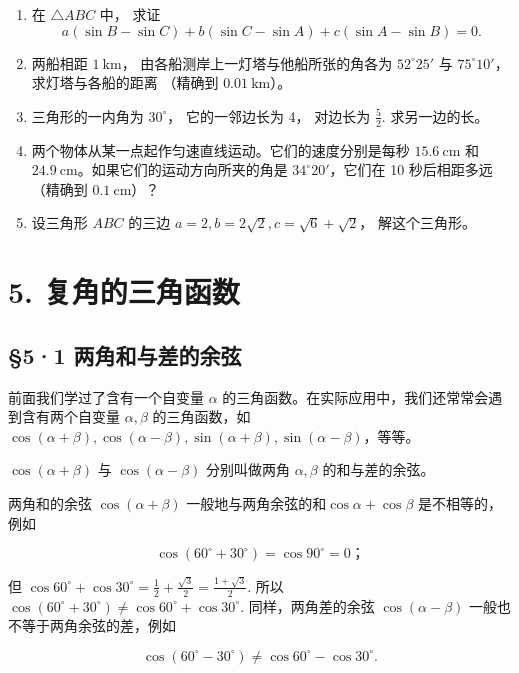 \begin{enumerate}
\item
  在 \(\triangle ABC\) 中， 求证
\[
a (\sin B - \sin C) + b (\sin C - \sin A) + c (\sin A - \sin B) = 0.
\]
\item
  两船相距 \(1 \mathrm{~km}\)， 由各船测岸上一灯塔与他船所张的角各为
  \(52^{\circ} 25'\) 与 \(75^{\circ} 10'\)， 求灯塔与各船的距离 （精确到
  \(0.01 \mathrm{~km}\)）。
\item
  三角形的一内角为 \(30^{\circ}\)， 它的一邻边长为 4， 对边长为
  \(\frac{5}{2}\). 求另一边的长。
\item
  两个物体从某一点起作匀速直线运动。它们的速度分别是每秒
  \(15.6 \mathrm{~cm}\) 和
  \(24.9 \mathrm{~cm}\)。如果它们的运动方向所夹的角是
  \(34^{\circ}20'\)，它们在 10 秒后相距多远（精确到
  \(0.1 \mathrm{~cm}\)）？
\item
  设三角形 \(ABC\) 的三边
  \(a = 2, b = 2\sqrt{2}, c = \sqrt{6} + \sqrt{2}\)， 解这个三角形。
\end{enumerate}

\chapter{5. 复角的三角函数}

\section{§5·1 两角和与差的余弦}

前面我们学过了含有一个自变量 \(\alpha\)
的三角函数。在实际应用中，我们还常常会遇到含有两个自变量
\(\alpha, \beta\) 的三角函数，如
\(\cos (\alpha + \beta), \cos (\alpha - \beta), \sin (\alpha + \beta), \sin (\alpha - \beta)\)，等等。

\(\cos (\alpha +\beta)\) 与 \(\cos (\alpha -\beta)\) 分别叫做两角
\(\alpha ,\beta\) 的和与差的余弦。

两角和的余弦 \(\cos (\alpha +\beta)\)
一般地与两角余弦的和\(\cos \alpha +\cos \beta\) 是不相等的，例如

\[
\cos (60 ^{\circ} + 30 ^{\circ}) = \cos 90 ^{\circ} = 0\text{；}
\]

但
\(\cos 60^{\circ} + \cos 30^{\circ} = \frac{1}{2} +\frac{\sqrt{3}}{2} = \frac{1 + \sqrt{3}}{2}.\)
所以
\(\cos (60^{\circ} + 30^{\circ})\neq \cos 60^{\circ} + \cos 30^{\circ}.\)
同样，两角差的余弦 \(\cos (\alpha -\beta)\)
一般也不等于两角余弦的差，例如

\[
\cos (60 ^{\circ} - 30 ^{\circ}) \neq \cos 60 ^{\circ} - \cos 30 ^{\circ}.
\]


